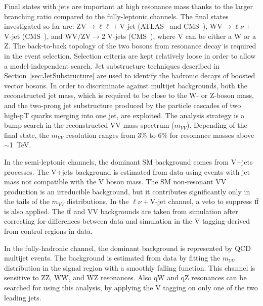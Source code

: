 \documentclass[3p,times,twocolumn]{elsarticle}
\begin{document}
Final states with jets are important at high resonance mass thanks to
the larger branching ratio compared to the fully-leptonic channels.
The final states investigated so far are: ZV$\rightarrow
\ell\ell +$V-jet (ATLAS~\cite{Aad:2014xka} and CMS~\cite{Khachatryan:2014gha}), 
WV$\rightarrow \ell\nu +$V-jet (CMS~\cite{Khachatryan:2014gha}), and
WV/ZV$\rightarrow$2 V-jets (CMS~\cite{Khachatryan:2014hpa}), where V can be either a W or
a Z. The back-to-back topology of the two bosons from resonance decay is required in
the event selection. Selection criteria are kept relatively loose in order
to allow a model-independent search. Jet substructure techniques described in
Section~\ref{sec:JetSubstructure} are used to identify the hadronic decays of 
boosted vector bosons. In order to discriminate against multijet
backgrounds, both the reconstructed jet mass, which is required to be
close to the W- or Z-boson mass, and the two-prong jet substructure
produced by the particle cascades of two high-pT quarks merging into
one jet, are exploited. The analysis strategy is a bump search in the reconstructed VV 
mass spectrum ($m_{VV}$). Depending of the final state, the $m_{VV}$ resolution ranges
from 3\% to 6\% for resonance masses above $\sim$1~TeV. 

In the semi-leptonic channels, 
the dominant SM background comes from V+jets processes.
The V+jets background is estimated from
data using events with jet mass not compatible with the V boson mass. 
The SM non-resonant VV production is an irreducible background, but it
contributes significantly only in the tails of the $m_{VV}$
distributions. In the $\ell\nu +$V-jet channel, a veto to suppress
$\rm{t}\bar{\rm{t}}$ is also applied. The $\rm{t}\bar{\rm{t}}$ and VV 
backgrounds are taken from simulation after correcting for 
differences between data and simulation in the V tagging derived 
from control regions in data. 

In the fully-hadronic channel, the dominant background 
is represented by QCD multijet events. The background is estimated
from data by fitting the $m_{VV}$ distribution in the signal region 
with a smoothly falling function. This channel is sensitive to
ZZ, WW, and WZ resonances. Also qW and qZ resonances can be 
searched for using this analysis, by applying the V tagging
on only one of the two leading jets.
\end{document}
